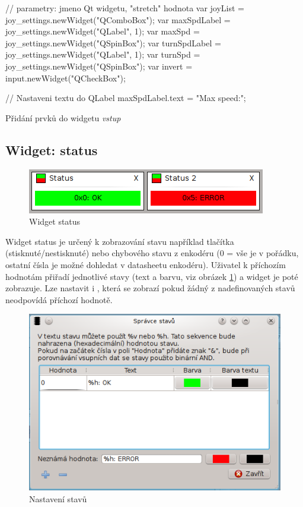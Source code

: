 \documentclass[12pt, a4paper, oneside]{article}
\newcommand{\It}{\textit}  %
\begin{document}
\begin{listing}[H]
\begin{jscode}
// parametry: jmeno Qt widgetu, "stretch" hodnota
var joyList = joy_settings.newWidget("QComboBox");
var maxSpdLabel = joy_settings.newWidget("QLabel", 1);
var maxSpd = joy_settings.newWidget("QSpinBox");
var turnSpdLabel = joy_settings.newWidget("QLabel", 1);
var turnSpd = joy_settings.newWidget("QSpinBox");
var invert = input.newWidget("QCheckBox");

// Nastaveni textu do QLabel
maxSpdLabel.text = "Max speed:";
\end{jscode}
\caption{Přidání prvků do widgetu \It{vstup}}
\label{input_script}
\end{listing}

\subsection{Widget: status}
\begin{figure}[H]
\begin{center}
\includegraphics[scale=1]{img/w_status.png}
\caption{Widget status}
\end{center}
\end{figure}
Widget status je určený k zobrazování stavu například tlačítka (stisknuté/nestisknuté) nebo chybového stavu z enkodéru (0 = vše je v pořádku, ostatní čísla je možné dohledat v datasheetu enkodéru). Uživatel k příchozím hodnotám přiřadí jednotlivé stavy (text a barvu, viz obrázek \ref{status_dlg}) a widget je poté zobrazuje. Lze nastavit i , která se zobrazí pokud žádný z nadefinovaných stavů neodpovídá příchozí hodnotě.
\begin{figure}[H]
\begin{center}
\includegraphics[scale=1]{img/w_status_dlg.png}
\caption{Nastavení stavů}
\label{status_dlg}
\end{center}
\end{figure} 
\end{document}

